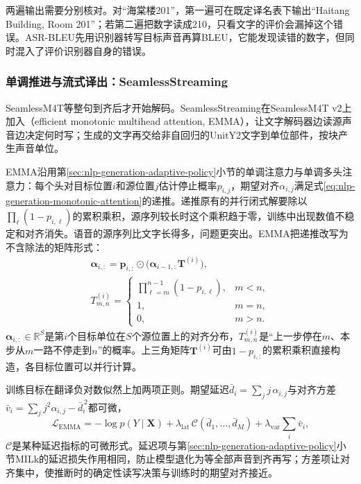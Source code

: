 两遍输出需要分别核对。对“海棠楼201”，第一遍可在既定译名表下输出“Haitang Building, Room 201”；若第二遍把数字读成210，只看文字的评价会漏掉这个错误。ASR-BLEU先用识别器转写目标声音再算BLEU，它能发现读错的数字，但同时混入了评价识别器自身的错误。

\subsubsection{单调推进与流式译出：SeamlessStreaming}
\label{sec:nlp-speech-seamless-streaming}

SeamlessM4T等整句到齐后才开始解码。SeamlessStreaming在SeamlessM4T v2上加入（efficient monotonic multihead attention, EMMA），让文字解码器边读源声音边决定何时写；生成的文字再交给非自回归的UnitY2文字到单位部件，按块产生声音单位\cite{nlp-speech-seamless2023streaming,nlp-speech-ma2023emma}。

EMMA沿用第\ref{sec:nlp-generation-adaptive-policy}小节的单调注意力与单调多头注意力：每个头对目标位置$i$和源位置$j$估计停止概率$p_{i,j}$，期望对齐$\alpha_{i,j}$满足式\eqref{eq:nlp-generation-monotonic-attention}的递推。递推原有的并行闭式解要除以$\prod_{\ell}(1-p_{i,\ell})$的累积乘积，源序列较长时这个乘积趋于零，训练中出现数值不稳定和对齐消失。语音的源序列比文字长得多，问题更突出。EMMA把递推改写为不含除法的矩阵形式：
\begin{equation}
 \begin{gathered}
 \bm\alpha_{i,:}=\bm p_{i,:}\odot\bigl(\bm\alpha_{i-1,:}\bm T^{(i)}\bigr),\\
 T^{(i)}_{m,n}=\begin{cases}\prod_{\ell=m}^{n-1}(1-p_{i,\ell}),&m<n,\\1,&m=n,\\0,&m>n.\end{cases}
 \end{gathered}
 \label{eq:nlp-speech-emma}
\end{equation}
$\bm\alpha_{i,:}\in\mathbb R^{S}$是第$i$个目标单位在$S$个源位置上的对齐分布，$T^{(i)}_{m,n}$是“上一步停在$m$、本步从$m$一路不停走到$n$”的概率。上三角矩阵$\bm T^{(i)}$可由$1-p_{i,:}$的累积乘积直接构造，各目标位置可以并行计算。

训练目标在翻译负对数似然上加两项正则。期望延迟$\bar d_i=\sum_j j\,\alpha_{i,j}$与对齐方差$\bar v_i=\sum_j j^2\alpha_{i,j}-\bar d_i^{\,2}$都可微，
\begin{equation}
 \mathcal L_{\mathrm{EMMA}}=-\log p(Y\mid\bm X)+\lambda_{\mathrm{lat}}\,\mathcal C(\bar d_1,\ldots,\bar d_M)+\lambda_{\mathrm{var}}\sum_{i}\bar v_i,
 \label{eq:nlp-speech-emma-loss}
\end{equation}
$\mathcal C$是某种延迟指标的可微形式。延迟项与第\ref{sec:nlp-generation-adaptive-policy}小节MILk的延迟损失作用相同，防止模型退化为等全部声音到齐再写；方差项让对齐集中，使推断时的确定性读写决策与训练时的期望对齐接近。

